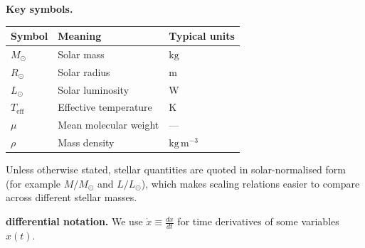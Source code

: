 

\bigskip
\noindent\textbf{Key symbols.}
\begin{center}
\begin{tabular}{@{}lll@{}}
  \toprule
  Symbol & Meaning & Typical units \\
  \midrule
  $M_\odot$                & Solar mass                        & $\mathrm{kg}$ \\
  $R_\odot$                & Solar radius                      & $\mathrm{m}$ \\
  $L_\odot$                & Solar luminosity                  & $\mathrm{W}$ \\
  $T_\mathrm{eff}$         & Effective temperature             & $\mathrm{K}$ \\
  $\mu$                    & Mean molecular weight             & --- \\
  $\rho$                   & Mass density                      & $\mathrm{kg\,m^{-3}}$ \\
  \bottomrule
\end{tabular}
\end{center}

\begin{remark}
  Unless otherwise stated, stellar quantities are quoted in solar-normalised form
  (for example $M/M_\odot$ and $L/L_\odot$), which makes scaling relations easier
  to compare across different stellar masses.
\end{remark}



\bigskip \noindent
\textbf{differential notation.}\quad
We use $\dot{x} \equiv \frac{dx}{dt}$ for time derivatives of some variables $x(t)$.

\clearpage
